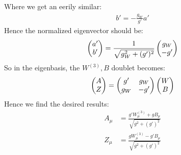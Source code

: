 \documentclass[12pt]{article}
\begin{document}
Where we get an eerily similar:
\begin{align*}
  b'=-\frac{g_W}{g'}a'
\end{align*}
Hence the normalized eigenvector should be:
\begin{align*}
  \pmqty{a'\\b'}=\frac1{\sqrt{g_W^2+(g')^2}}\pmqty{g_W\\-g'}
\end{align*}
So in the eigenbasis, the $W^{(3)},B$ doublet becomes:
\begin{align*}
  \pmqty{A\\Z}=\pmqty{g'&g_W\\g_W&-g'}\pmqty{W\\B}
\end{align*}
Hence we find the desired results:
\begin{equation}
  \label{eq:p5}
  \boxed{
    \begin{aligned}
      A_\mu&=\frac{g' W_\mu^{(3)}+gB_\mu}{\sqrt{g^2+(g')^2}}\\
      Z_\mu&=\frac{g W_\mu^{(3)}-g'B_\mu}{\sqrt{g^2+(g')^2}}
    \end{aligned}
  }
\end{equation}
\end{document}
